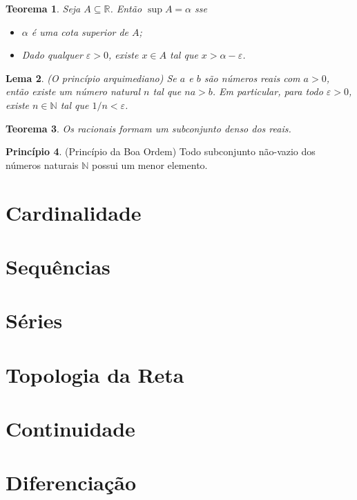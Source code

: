 \documentclass[12pt]{article}
\theoremstyle{plain}
\newtheorem{thm}{Teorema}[section]
\newtheorem{lem}[thm]{Lema}
\theoremstyle{definition}
\newtheorem{prcp}[thm]{Princípio}
\theoremstyle{remark}
\begin{document}
\begin{thm}
    Seja \(A \subseteq \mathbb{R}\). Então \(\sup A = \alpha\) sse
    \begin{itemize}
        \item [(i)] \(\alpha\) é uma cota superior de \(A\);
        \item [(ii)] Dado qualquer \(\varepsilon > 0\), existe \(x \in A\) tal que \(x > \alpha - \varepsilon\).
    \end{itemize}
\end{thm}

\begin{lem} (O princípio arquimediano)
    Se \(a\) e \(b\) são números reais com \(a > 0\), então existe um número natural \(n\) tal que \(na > b\). Em particular, para todo \(\varepsilon > 0\), existe \(n \in \mathbb{N}\) tal que \(1/n < \varepsilon\).
\end{lem}

\begin{thm}
    Os racionais formam um subconjunto denso dos reais.
\end{thm}

\begin{prcp} (Princípio da Boa Ordem)
    Todo subconjunto não-vazio dos números naturais \(\mathbb{N}\) possui um menor elemento.
\end{prcp}

\section{Cardinalidade}

\section{Sequências}

\section{Séries}

\section{Topologia da Reta}

\section{Continuidade}



\newpage
\section{Diferenciação}
\end{document}
